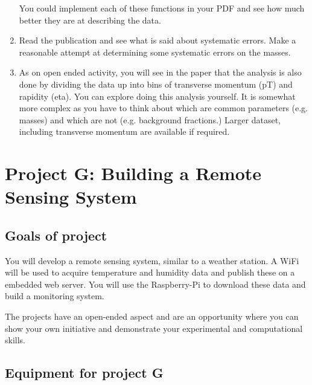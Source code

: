 \begin{enumerate}
You could implement each of these functions in your PDF and see how much better they are at describing the data.

\item Read the publication and see what is said about systematic errors.  Make a reasonable attempt at determining some systematic errors on the masses.

\item As on open ended activity, you will see in the paper that the analysis is also done by dividing the data up into bins of transverse momentum (pT) and rapidity (eta). You can explore doing this analysis yourself. It is somewhat more complex as you have to think about which are common parameters (e.g. masses) and which are not (e.g. background fractions.) Larger dataset, including transverse momentum are available if required.

\end{enumerate}

 
 
 
\newpage
\section{Project G: Building a Remote Sensing System}

\subsection{Goals of project}

You will develop a remote sensing system, similar to a weather station.
A WiFi \microcontroller will be used to acquire temperature and humidity data
and publish these on a embedded web server. You will use the Raspberry-Pi to
download these data and build a monitoring system.


The projects have an open-ended aspect and are an opportunity where you can show your own initiative and demonstrate your experimental and computational skills. 

\subsection{Equipment for project G}

